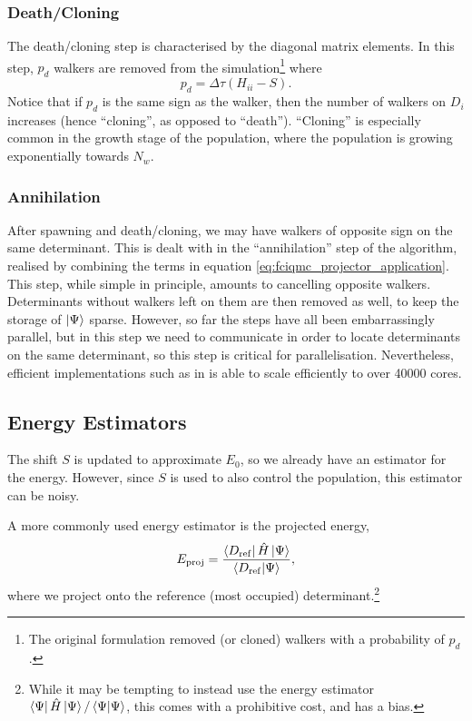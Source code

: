 \subsubsection{Death/Cloning}

The death/cloning step is characterised by the diagonal matrix elements. In this step, $p_d$ walkers are removed from the simulation\footnote{The original formulation removed (or cloned) walkers with a probability of $p_d$.} where
\begin{equation}
    p_d = \Delta\tau(H_{ii}-S).
\end{equation}
Notice that if $p_d$ is the same sign as the walker, then the number of walkers on $D_i$ increases (hence ``cloning'', as opposed to ``death''). ``Cloning'' is especially common in the growth stage of the population, where the population is growing exponentially towards $N_w$.

\subsubsection{Annihilation}

After spawning and death/cloning, we may have walkers of opposite sign on the same determinant. This is dealt with in the ``annihilation'' step of the algorithm, realised by combining the terms in equation \ref{eq:fciqmc_projector_application}. This step, while simple in principle, amounts to cancelling opposite walkers. Determinants without walkers left on them are then removed as well, to keep the storage of $\ket\Psi$ sparse. However, so far the steps have all been embarrassingly parallel, but in this step we need to communicate in order to locate determinants on the same determinant, so this step is critical for parallelisation. Nevertheless, efficient implementations such as in \neci is able to scale efficiently to over 40000 cores.\supercite{Booth2014}

\subsection{Energy Estimators}
\label{sec:fciqmc_energy_estimators}

The shift $S$ is updated to approximate $E_0$, so we already have an estimator for the energy. However, since $S$ is used to also control the population, this estimator can be noisy.\supercite{booth_fciqmc_2009}

A more commonly used energy estimator is the projected energy,
\begin{equation}
    \label{eq:projected_energy}
    E_\mathrm{proj} = \frac{\bra{D_\mathrm{ref}}\hat H\ket{\Psi}}{\braket{D_\mathrm{ref}}{\Psi}},
\end{equation}
where we project onto the reference (most occupied) determinant.\footnote{While it may be tempting to instead use the energy estimator $\bra{\Psi}\hat H\ket{\Psi}/\braket{\Psi}{\Psi}$, this comes with a prohibitive cost, and has a bias.\supercite{bluntDensitymatrix2014,booth_fciqmc_2009}
}

